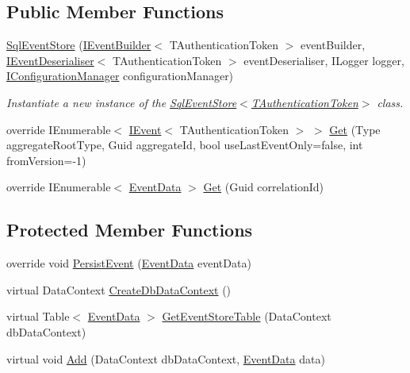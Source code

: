 \subsection*{Public Member Functions}
\begin{DoxyCompactItemize}
\item 
\hyperlink{classCqrs_1_1Events_1_1SqlEventStore_a15df78a1b12d2e3035b9715e9bfc8535_a15df78a1b12d2e3035b9715e9bfc8535}{Sql\+Event\+Store} (\hyperlink{interfaceCqrs_1_1Events_1_1IEventBuilder}{I\+Event\+Builder}$<$ T\+Authentication\+Token $>$ event\+Builder, \hyperlink{interfaceCqrs_1_1Events_1_1IEventDeserialiser}{I\+Event\+Deserialiser}$<$ T\+Authentication\+Token $>$ event\+Deserialiser, I\+Logger logger, \hyperlink{interfaceCqrs_1_1Configuration_1_1IConfigurationManager}{I\+Configuration\+Manager} configuration\+Manager)
\begin{DoxyCompactList}\small\item\em Instantiate a new instance of the \hyperlink{classCqrs_1_1Events_1_1SqlEventStore_a15df78a1b12d2e3035b9715e9bfc8535_a15df78a1b12d2e3035b9715e9bfc8535}{Sql\+Event\+Store$<$\+T\+Authentication\+Token$>$} class. \end{DoxyCompactList}\item 
override I\+Enumerable$<$ \hyperlink{interfaceCqrs_1_1Events_1_1IEvent}{I\+Event}$<$ T\+Authentication\+Token $>$ $>$ \hyperlink{classCqrs_1_1Events_1_1SqlEventStore_a7e32a08a015642a5bc1cefa6998e6f11_a7e32a08a015642a5bc1cefa6998e6f11}{Get} (Type aggregate\+Root\+Type, Guid aggregate\+Id, bool use\+Last\+Event\+Only=false, int from\+Version=-\/1)
\item 
override I\+Enumerable$<$ \hyperlink{classCqrs_1_1Events_1_1EventData}{Event\+Data} $>$ \hyperlink{classCqrs_1_1Events_1_1SqlEventStore_ac1fb2bdec07cbeec57fb3d985e7a8b31_ac1fb2bdec07cbeec57fb3d985e7a8b31}{Get} (Guid correlation\+Id)
\end{DoxyCompactItemize}
\subsection*{Protected Member Functions}
\begin{DoxyCompactItemize}
\item 
override void \hyperlink{classCqrs_1_1Events_1_1SqlEventStore_a8d67570d50a97050cbce5a29d7a4b9f6_a8d67570d50a97050cbce5a29d7a4b9f6}{Persist\+Event} (\hyperlink{classCqrs_1_1Events_1_1EventData}{Event\+Data} event\+Data)
\item 
virtual Data\+Context \hyperlink{classCqrs_1_1Events_1_1SqlEventStore_a47a3fb01f9ccc65ec52ad96236cea3fb_a47a3fb01f9ccc65ec52ad96236cea3fb}{Create\+Db\+Data\+Context} ()
\item 
virtual Table$<$ \hyperlink{classCqrs_1_1Events_1_1EventData}{Event\+Data} $>$ \hyperlink{classCqrs_1_1Events_1_1SqlEventStore_a6daa6c32874ab593d0d8a54c90d219c6_a6daa6c32874ab593d0d8a54c90d219c6}{Get\+Event\+Store\+Table} (Data\+Context db\+Data\+Context)
\item 
virtual void \hyperlink{classCqrs_1_1Events_1_1SqlEventStore_a94ce64c00db57e5b9dbd10f74a4cef5b_a94ce64c00db57e5b9dbd10f74a4cef5b}{Add} (Data\+Context db\+Data\+Context, \hyperlink{classCqrs_1_1Events_1_1EventData}{Event\+Data} data)
\end{DoxyCompactItemize}
